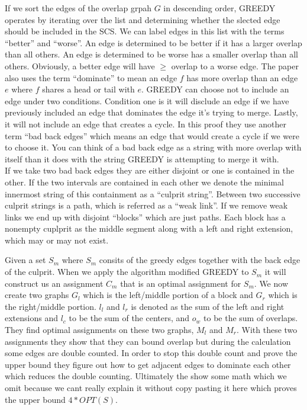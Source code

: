 \documentclass[letterpaper,11pt,titlepage]{article}
\begin{document}
If we sort the edges of the overlap grpah $G$ in descending order, GREEDY operates by iterating over the list and determining whether the slected edge should be included in the SCS. We can label edges in this list with the terms ``better'' and ``worse''. An edge is determined to be better if it has a larger overlap than all others. An edge is determined to be worse has a smaller overlap than all others. Obviously, a better edge will have $\geq$ overlap to a worse edge. The paper also uses the term ``dominate'' to mean an edge $f$ has more overlap than an edge $e$ where $f$ shares a head or tail with $e$. GREEDY can choose not to include an edge under two conditions. Condition one is it will disclude an edge if we have previously included an edge that dominates the edge it's trying to merge. Lastly, it will not include an edge that creates a cycle. In this proof they use another term ``bad back edges'' which means an edge that would create a cycle if we were to choose it. You can think of a bad back edge as a string with more overlap with itself than it does with the string GREEDY is attempting to merge it with.\\

If we take two bad back edges they are either disjoint or one is contained in the other. If the two intervals are contained in each other we denote the minimal innermost string of this containment as a ``culprit string''. Between two successive culprit strings is a path, which is referred as a ``weak link''. If we remove weak links we end up with disjoint ``blocks'' which are just paths. Each block has a nonempty cuplprit as the middle segment along with a left and right extension, which may or may not exist.

Given a set $S_m$ where $S_m$ consits of the greedy edges together with the back edge of the culprit. When we apply the algorithm modified GREEDY to $S_m$ it will construct us an assignment $C_m$ that is an optimal assignment for $S_m$. We now create two graphs $G_l$ which is the left/middle portion of a block and $G_r$ which is the right/middle portion. $l_l$ and $l_r$ is denoted as the sum of the left and right extensions and $l_c$ to be the sum of the centers, and $o_w$ to be the sum of overlaps. They find optimal assignments on these two graphs, $M_l$ and $M_r$. With these two assignments they show that they can bound overlap but during the calculation some edges are double counted. In order to stop this double count and prove the upper bound they figure out how to get adjacent edges to dominate each other which reduces the double counting. Ultimately the show some math which we omit because we cant really explain it without copy pasting it here which proves the upper bound $4 * OPT(S)$.
\end{document}

